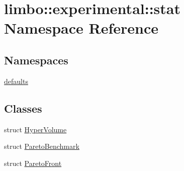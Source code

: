 \hypertarget{namespacelimbo_1_1experimental_1_1stat}{}\section{limbo\+:\+:experimental\+:\+:stat Namespace Reference}
\label{namespacelimbo_1_1experimental_1_1stat}
\subsection*{Namespaces}
\begin{DoxyCompactItemize}
\item 
 \hyperlink{namespacelimbo_1_1experimental_1_1stat_1_1defaults}{defaults}
\end{DoxyCompactItemize}
\subsection*{Classes}
\begin{DoxyCompactItemize}
\item 
struct \hyperlink{structlimbo_1_1experimental_1_1stat_1_1_hyper_volume}{Hyper\+Volume}
\item 
struct \hyperlink{structlimbo_1_1experimental_1_1stat_1_1_pareto_benchmark}{Pareto\+Benchmark}
\item 
struct \hyperlink{structlimbo_1_1experimental_1_1stat_1_1_pareto_front}{Pareto\+Front}
\end{DoxyCompactItemize}
